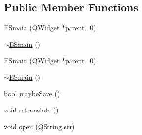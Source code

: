 \subsection*{Public Member Functions}
\begin{DoxyCompactItemize}
\item 
\hyperlink{class_e_smain_a677bd7496b3e982cff595b81280d052b}{ESmain} (QWidget $\ast$parent=0)
\item 
\hyperlink{class_e_smain_ae5aa6097311ca683d0b19859b74dc5dc}{$\sim$ESmain} ()
\item 
\hyperlink{class_e_smain_a677bd7496b3e982cff595b81280d052b}{ESmain} (QWidget $\ast$parent=0)
\item 
\hyperlink{class_e_smain_ae5aa6097311ca683d0b19859b74dc5dc}{$\sim$ESmain} ()
\item 
bool \hyperlink{class_e_smain_a798513a3d2db6b60218c748b100a7eaf}{maybeSave} ()
\item 
void \hyperlink{class_e_smain_a9caf537bd000413aea1bd9a9f079d14b}{retranslate} ()
\item 
void \hyperlink{class_e_smain_a7c277f8ea026b94e4067b0f0920fc241}{open} (QString str)
\end{DoxyCompactItemize}


